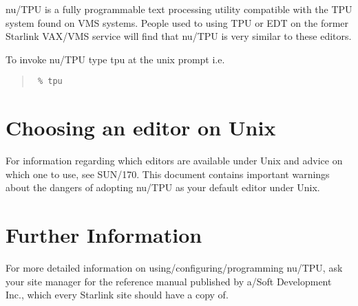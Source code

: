 nu/TPU is a fully programmable text processing utility compatible
with the TPU system found on VMS systems. People used to using
TPU or EDT on the former Starlink VAX/VMS service will find that
nu/TPU is very similar to these editors.

To invoke nu/TPU type tpu at the unix prompt i.e.

\begin{quote}\tt
\% tpu
\end{quote}

\section{Choosing an editor on Unix}

For information regarding which editors are available under Unix and
advice on which one to use, see SUN/170. This document contains
important warnings about the dangers of adopting nu/TPU as your default
editor under Unix.

\section{Further Information}

For more detailed information on using/configuring/programming nu/TPU,
ask your site manager for the reference manual published by a/Soft
Development Inc., which every Starlink site should have a copy of.



